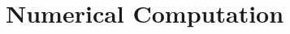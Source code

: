 \documentclass[11pt, twocolumn]{report}
\begin{document}
\setcounter{chapter}{3}
\chapter{Numerical Computation}
\end{document}
